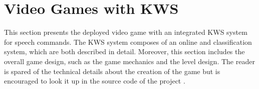
\chapter{Video Games with KWS}\label{sec:game}
This section presents the deployed video game with an integrated KWS system for speech commands.
The KWS system composes of an online and classification system, which are both described in detail.
Moreover, this section includes the overall game design, such as the game mechanics and the level design.
The reader is spared of the technical details about the creation of the game but is encouraged to look it up in the source code of the project \cite{KWSGame}.



